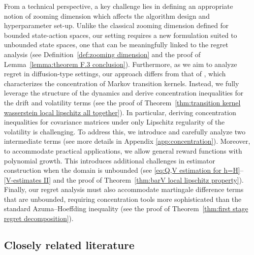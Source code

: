 \documentclass[final,supplement]{siamart251216}
\begin{document}
From a technical perspective, a key challenge lies in defining an appropriate notion of zooming dimension which affects the algorithm design and hyperparameter set-up. Unlike the classical zooming dimension defined for bounded state-action spaces, our setting requires a new formulation suited to unbounded state spaces, one that can be meaningfully linked to the regret analysis (see Definition~\ref{def:zooming dimension} and the proof of Lemma~\ref{lemma:theorem F.3 conclusion}). Furthermore, as we aim to analyze regret in diffusion-type settings, our approach differs from that of \cite{sinclair2023adaptive}, which characterizes the concentration of Markov transition kernels. Instead, we fully leverage the structure of the dynamics and derive concentration inequalities for the drift and volatility terms (see the proof of Theorem~\ref{thm:transition kernel wasserstein local lipschitz all together}). In particular, deriving concentration inequalities for covariance matrices under only Lipschitz regularity of the volatility is challenging. To address this, we introduce and carefully analyze two intermediate terms (see more details in Appendix \ref{app:concentration}).  Moreover, to accommodate practical applications, we allow general reward functions with polynomial growth. This introduces additional challenges in estimator construction when the domain is unbounded (see \eqref{eq:Q,V estimation for h=H}–\eqref{V-estimates II} and the proof of Theorem~\ref{thm:barV local lipschitz property}). Finally, our regret analysis must also accommodate martingale difference terms that are unbounded, requiring concentration tools more sophisticated than the standard Azuma–Hoeffding inequality (see the proof of Theorem~\ref{thm:first stage regret decomposition}).



\subsection{Closely related literature} 
\end{document}
